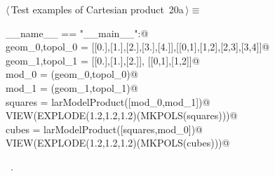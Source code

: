 \documentclass[11pt,oneside]{article}	%
\begin{document}
\begin{flushleft} \small
\begin{minipage}{\linewidth} \label{scrap29}
\protect{}$\langle\,$Test examples of Cartesian product\nobreak\ {\footnotesize 20a}$\,\rangle\equiv$
\vspace{-1ex}
\begin{list}{}{} \item
\mbox{}\verb@if __name__ == "__main__":@\\
\mbox{}\verb@    geom_0,topol_0 = [[0.],[1.],[2.],[3.],[4.]],[[0,1],[1,2],[2,3],[3,4]]@\\
\mbox{}\verb@    geom_1,topol_1 = [[0.],[1.],[2.]], [[0,1],[1,2]]@\\
\mbox{}\verb@    mod_0 = (geom_0,topol_0)@\\
\mbox{}\verb@    mod_1 = (geom_1,topol_1)@\\
\mbox{}\verb@    squares = larModelProduct([mod_0,mod_1])@\\
\mbox{}\verb@    VIEW(EXPLODE(1.2,1.2,1.2)(MKPOLS(squares)))@\\
\mbox{}\verb@    cubes = larModelProduct([squares,mod_0])@\\
\mbox{}\verb@    VIEW(EXPLODE(1.2,1.2,1.2)(MKPOLS(cubes)))@\\
\mbox{}\verb@@{\NWsep}
\end{list}
\vspace{-1ex}
\footnotesize\addtolength{\baselineskip}{-1ex}
\begin{list}{}{\setlength{\itemsep}{-\parsep}\setlength{\itemindent}{-\leftmargin}}
\item \NWtxtMacroRefIn\ .
\end{list}
\end{minipage}\\[4ex]
\end{flushleft}
\end{document}

